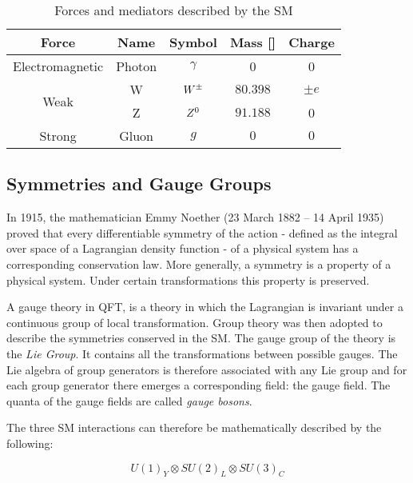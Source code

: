 				\begin{table}[!htb]\centering\caption{Forces and mediators described by the SM}							
					\begin{tabular}{c|c|c|c|c}
						\hline \hline
						Force & Name & Symbol & Mass [\GeV]& Charge \\ \hline \hline
						Electromagnetic & Photon & $\gamma$ & 0 & 0 \\ \hline
						\multirow{2}{*}{Weak} & W & $W^{\pm}$ & $80.398$ & $\pm e$ \\
						& Z & $Z^0$ & $91.188$ & 0 \\\hline
						Strong & Gluon & $g$ & $0$ & $0$ \\\hline\hline
					\end{tabular}						
				\label{tab:interactions} 
				\end{table}


			\subsection*{Symmetries and Gauge Groups}

				In 1915, the mathematician Emmy Noether (23 March 1882 – 14 April 1935) proved that every differentiable symmetry of the action - defined as the integral over space of a Lagrangian density function - of a physical system has a corresponding conservation law. More generally, a symmetry is a property of a physical system. Under certain transformations this property is preserved. 

				A gauge theory in QFT, is a theory in which the Lagrangian is invariant under a continuous group of local transformation. Group theory was then adopted to describe the symmetries conserved in the SM.  
				The gauge group of the theory is the \emph{Lie Group}. It contains all the transformations between possible gauges. The Lie algebra of group generators is therefore associated with any Lie group and for each group generator there emerges a corresponding field: the gauge field. The quanta of the gauge fields are called \emph{gauge bosons}.
				
				The three SM interactions can therefore be mathematically described by the following:

				\begin{equation}
					U(1)_Y \otimes SU(2)_L \otimes SU(3)_C
					\label{eq:SM_description}
				\end{equation}

